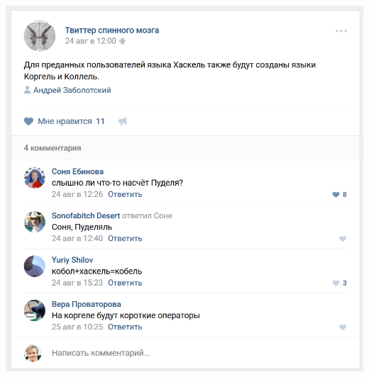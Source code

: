 \begin{frame}
	\begin{center}
		\includegraphics[scale=0.3]{twispicord-haskell.png}
	\end{center}
\end{frame}
